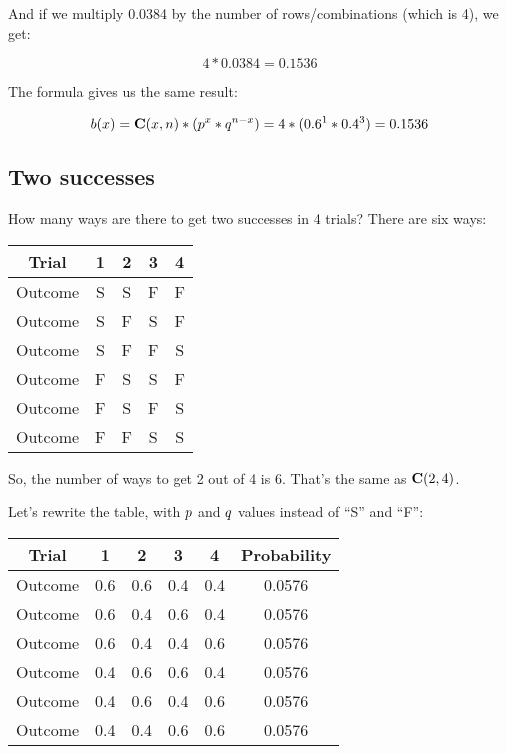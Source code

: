 \documentclass[../../../main.tex]{subfiles}
\begin{document}
\noindent
And if we multiply 0.0384 by the number of rows/combinations (which is 4), we get:

\begin{equation*}
    4 * 0.0384 = 0.1536
\end{equation*}

The formula gives us the same result:

\begin{equation*}
  \Binom{\RandVarVal/} = \combs{\RandVarVal/}{n} * (p^{\RandVarVal/} * q^{n - \RandVarVal/}) = 4 * (0.6^{1} * 0.4^{3}) = 0.1536
\end{equation*}


\subsection{Two successes}

How many ways are there to get two successes in 4 trials? There are six ways:

\begin{center}
  \begin{tabular}{| c | c | c | c | c |}
    \hline
    \textbf{Trial} & \textbf{1} & \textbf{2} & \textbf{3} & \textbf{4} \\ \hline
  Outcome & S & S & F & F \\ \hline
  Outcome & S & F & S & F \\ \hline
  Outcome & S & F & F & S \\ \hline
  Outcome & F & S & S & F \\ \hline
  Outcome & F & S & F & S \\ \hline
  Outcome & F & F & S & S \\ \hline
  \end{tabular}
\end{center}

\noindent
So, the number of ways to get 2 out of 4 is 6. That's the same as $\mathbf{C}(2, 4)$. 

Let's rewrite the table, with $\success/$ and $\failure/$ values instead of ``S'' and ``F'':

\begin{center}
  \begin{tabular}{| c | c | c | c | c | c |}
    \hline
    \textbf{Trial} & \textbf{1} & \textbf{2} & \textbf{3} & \textbf{4} & \textbf{Probability} \\ \hline
  Outcome & 0.6 & 0.6 & 0.4 & 0.4 & 0.0576 \\ \hline
  Outcome & 0.6 & 0.4 & 0.6 & 0.4 & 0.0576 \\ \hline
  Outcome & 0.6 & 0.4 & 0.4 & 0.6 & 0.0576 \\ \hline
  Outcome & 0.4 & 0.6 & 0.6 & 0.4 & 0.0576 \\ \hline
  Outcome & 0.4 & 0.6 & 0.4 & 0.6 & 0.0576 \\ \hline
  Outcome & 0.4 & 0.4 & 0.6 & 0.6 & 0.0576 \\ \hline
  \end{tabular}
\end{center}
\end{document}
